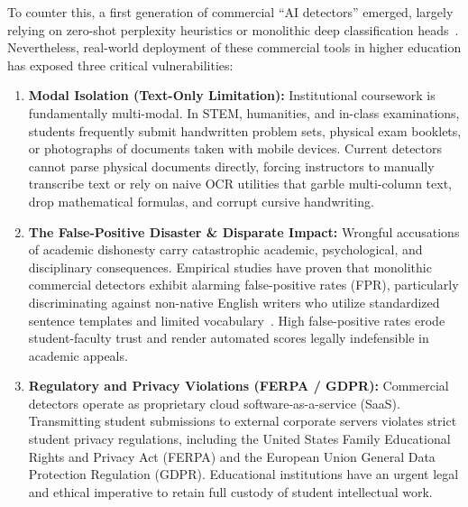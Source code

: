 \documentclass[journal]{IEEEtran}
\begin{document}
To counter this, a first generation of commercial ``AI detectors'' emerged, largely relying on zero-shot perplexity heuristics or monolithic deep classification heads~\cite{mitchell2023detectgpt}. Nevertheless, real-world deployment of these commercial tools in higher education has exposed three critical vulnerabilities:
\begin{enumerate}
    \item \textbf{Modal Isolation (Text-Only Limitation):} Institutional coursework is fundamentally multi-modal. In STEM, humanities, and in-class examinations, students frequently submit handwritten problem sets, physical exam booklets, or photographs of documents taken with mobile devices. Current detectors cannot parse physical documents directly, forcing instructors to manually transcribe text or rely on naive OCR utilities that garble multi-column text, drop mathematical formulas, and corrupt cursive handwriting.
    \item \textbf{The False-Positive Disaster \& Disparate Impact:} Wrongful accusations of academic dishonesty carry catastrophic academic, psychological, and disciplinary consequences. Empirical studies have proven that monolithic commercial detectors exhibit alarming false-positive rates (FPR), particularly discriminating against non-native English writers who utilize standardized sentence templates and limited vocabulary~\cite{liang2023gpt}. High false-positive rates erode student-faculty trust and render automated scores legally indefensible in academic appeals.
    \item \textbf{Regulatory and Privacy Violations (FERPA / GDPR):} Commercial detectors operate as proprietary cloud software-as-a-service (SaaS). Transmitting student submissions to external corporate servers violates strict student privacy regulations, including the United States Family Educational Rights and Privacy Act (FERPA) and the European Union General Data Protection Regulation (GDPR). Educational institutions have an urgent legal and ethical imperative to retain full custody of student intellectual work.
\end{enumerate}
\end{document}
